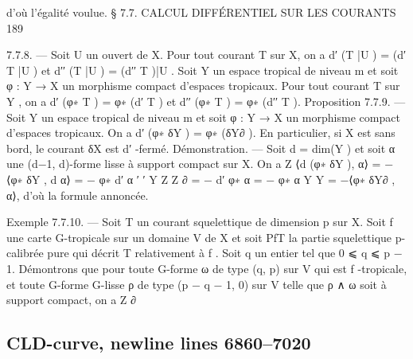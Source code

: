 \documentclass[
  10pt,
]{article}
\newenvironment{Shaded}{}{}
\newcommand{\NormalTok}[1]{#1}
\begin{document}
\begin{Shaded}
\begin{Highlighting}[]
\NormalTok{d’où l’égalité voulue.}
\NormalTok{                      § 7.7. CALCUL DIFFÉRENTIEL SUR LES COURANTS                                 189}

\NormalTok{7.7.8. — Soit U un ouvert de X. Pour tout courant T sur X, on a d′ (T |U ) = (d′ T |U )}
\NormalTok{et d′′ (T |U ) = (d′′ T )|U .}
\NormalTok{   Soit Y un espace tropical de niveau m et soit φ : Y → X un morphisme compact}
\NormalTok{d’espaces tropicaux. Pour tout courant T sur Y , on a d′ (φ∗ T ) = φ∗ (d′ T ) et d′′ (φ∗ T ) =}
\NormalTok{φ∗ (d′′ T ).}
\NormalTok{Proposition 7.7.9. — Soit Y un espace tropical de niveau m et soit φ : Y → X un}
\NormalTok{morphisme compact d’espaces tropicaux. On a d′ (φ∗ δY ) = φ∗ (δY∂ ). En particulier, si X}
\NormalTok{est sans bord, le courant δX est d′ {-}fermé.}
\NormalTok{Démonstration. — Soit d = dim(Y ) et soit α une (d−1, d){-}forme lisse à support compact}
\NormalTok{sur X. On a}
\NormalTok{                                                       Z}
\NormalTok{                   ⟨d (φ∗ δY ), α⟩ = −⟨φ∗ δY , d α⟩ = − φ∗ d′ α}
\NormalTok{                     ′                          ′}
\NormalTok{                                                         Y}
\NormalTok{                                      Z               Z ∂}
\NormalTok{                                   = − d′ φ∗ α = −        φ∗ α}
\NormalTok{                                                Y                     Y}
\NormalTok{                                          = −⟨φ∗ δY∂ , α⟩,}
\NormalTok{d’où la formule annoncée.}

\NormalTok{Exemple 7.7.10. — Soit T un courant squelettique de dimension p sur X. Soit f une}
\NormalTok{carte G{-}tropicale sur un domaine V de X et soit PfT la partie squelettique p{-}calibrée}
\NormalTok{pure qui décrit T relativement à f . Soit q un entier tel que 0 ⩽ q ⩽ p − 1. Démontrons}
\NormalTok{que pour toute G{-}forme ω de type (q, p) sur V qui est f {-}tropicale, et toute G{-}forme}
\NormalTok{G{-}lisse ρ de type (p − q − 1, 0) sur V telle que ρ ∧ ω soit à support compact, on a}
\NormalTok{                                                 Z ∂}
\end{Highlighting}
\end{Shaded}

\subsection{CLD-curve, newline lines
6860--7020}\label{cld-curve-newline-lines-68607020}
\end{document}

